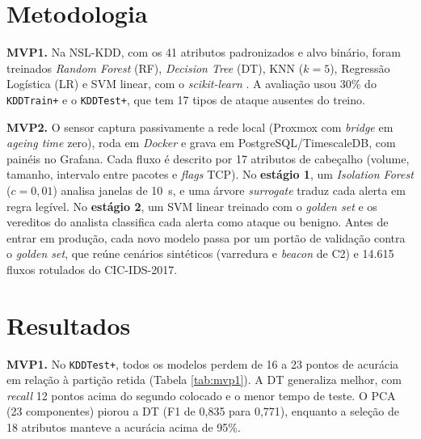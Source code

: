\documentclass[a4paper,10pt, twocolumn]{article}
\begin{document}
\section{Metodologia}
\textbf{MVP1.} Na NSL-KDD, com os 41 atributos padronizados e alvo binário, foram
treinados \textit{Random Forest} (RF), \textit{Decision Tree}
(DT), KNN ($k=5$), Regressão Logística (LR) e SVM linear, com o
\textit{scikit-learn} \cite{scikit2026learn}. A avaliação usou 30\% do
\texttt{KDDTrain+} e o \texttt{KDDTest+}, que tem 17 tipos de ataque ausentes do
treino.

\textbf{MVP2.} O sensor captura passivamente a rede local (Proxmox com
\textit{bridge} em \textit{ageing time} zero), roda em \textit{Docker}
\cite{Merkel2014Docker} e grava em PostgreSQL/TimescaleDB, com painéis no Grafana.
Cada fluxo é descrito por 17 atributos de cabeçalho (volume, tamanho, intervalo
entre pacotes e \textit{flags} TCP). No \textbf{estágio 1}, um \textit{Isolation
Forest} ($c = 0{,}01$) analisa janelas de 10~s, e uma árvore \textit{surrogate}
traduz cada alerta em regra legível. No \textbf{estágio 2}, um SVM linear treinado
com o \textit{golden set} e os vereditos do analista classifica cada alerta como
ataque ou benigno. Antes de entrar em produção, cada novo modelo passa por um portão
de validação contra o \textit{golden set}, que reúne cenários sintéticos (varredura
e \textit{beacon} de C2) e 14.615 fluxos rotulados do CIC-IDS-2017.

\section{Resultados}
\textbf{MVP1.} No \texttt{KDDTest+}, todos os modelos perdem de 16 a 23 pontos de
acurácia em relação à partição retida (Tabela \ref{tab:mvp1}). A DT generaliza
melhor, com \textit{recall} 12 pontos acima do segundo colocado e o menor tempo de
teste. O PCA (23 componentes) piorou a DT (F1 de 0,835 para 0,771), enquanto a
seleção de 18 atributos manteve a acurácia acima de 95\%.
\end{document}
